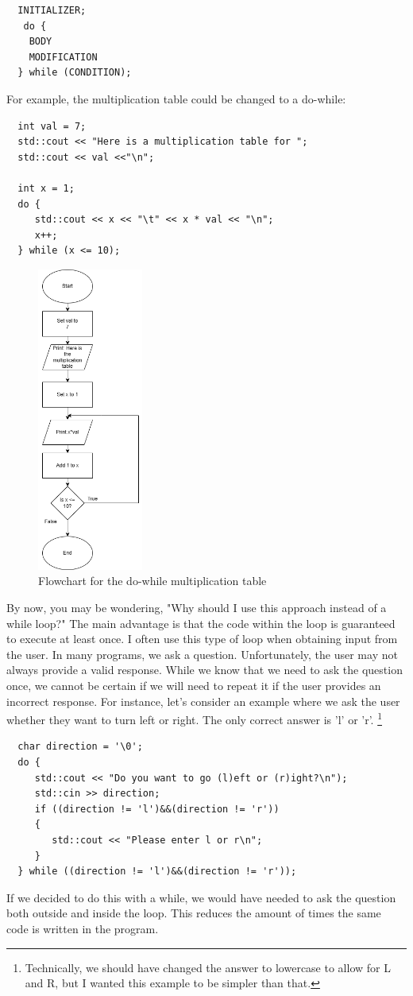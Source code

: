 \begin{verbatim}
  INITIALIZER;
   do {
    BODY
    MODIFICATION
  } while (CONDITION);
\end{verbatim}
%

For example, the multiplication table could be changed to a do-while:
\begin{lstlisting}
  int val = 7;
  std::cout << "Here is a multiplication table for ";
  std::cout << val <<"\n";
  
  int x = 1;
  do {
     std::cout << x << "\t" << x * val << "\n";
     x++;
  } while (x <= 10);
\end{lstlisting}
\begin{figure}[h]
    \centering
    \includegraphics[height=10cm]{images/do-whileflow.png}
    \caption{Flowchart for the do-while multiplication table}
    \label{fig:do-while}
\end{figure}
By now, you may be wondering, "Why should I use this approach instead of a while loop?" The main advantage is that the code within the loop is guaranteed to execute at least once. I often use this type of loop when obtaining input from the user. In many programs, we ask a question. Unfortunately, the user may not always provide a valid response. While we know that we need to ask the question once, we cannot be certain if we will need to repeat it if the user provides an incorrect response. For instance, let's consider an example where we ask the user whether they want to turn left or right. The only correct answer is 'l' or 'r'. \footnote{Technically, we should have changed the answer to lowercase to allow for L and R,
but I wanted this example to be simpler than that.}
\begin{lstlisting}
  char direction = '\0';
  do {
     std::cout << "Do you want to go (l)eft or (r)ight?\n");
     std::cin >> direction;
     if ((direction != 'l')&&(direction != 'r'))
     {
        std::cout << "Please enter l or r\n";
     }
  } while ((direction != 'l')&&(direction != 'r'));
\end{lstlisting}
If we decided to do this with a while, we would have needed to ask 
the question both outside and inside the loop. This reduces the 
amount of times the same code is written in the program.

